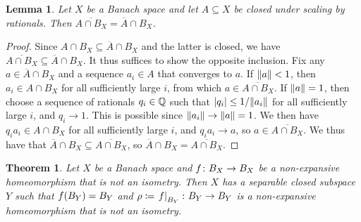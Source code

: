 \documentclass{amsart}
\newtheorem{theorem}{Theorem}[section]
\newtheorem{lemma}{Lemma}[section]
\theoremstyle{definition}
\newcommand{\clo}[1]{\overline{#1}}
\begin{document}
\begin{lemma}
    \label{rat-scaling}
    Let $X$ be a Banach space and let $A \subseteq X$ be closed under scaling by rationals. Then $\clo{A \cap B_X} = \clo{A} \cap B_X$.
\end{lemma}

\begin{proof}
Since $A \cap B_X \subseteq \clo{A} \cap B_X$ and the latter is closed, we
have $\clo{A \cap B_X} \subseteq \clo{A} \cap B_X$. It thus suffices to show
the opposite inclusion. Fix any $a \in \clo{A} \cap B_X$ and a sequence $a_i
\in A$ that converges to $a$. If $\norm{a} < 1$, then $a_i \in A \cap B_X$ for
all sufficiently large $i$, from which $a \in \clo{A \cap B_X}$. If $\norm{a} =
1$, then choose a sequence of rationals $q_i \in \mathbb{Q}$ such that $\abs{q_i} \leq 1/
\norm{a_i}$ for all sufficiently large $i$, and $q_i \to 1$. This is possible
since $\norm{a_i} \to \norm{a} = 1$. We then have $q_i a_i \in A \cap B_X$ for all
sufficiently large $i$, and $q_i a_i \to a$, so $a \in \clo{A \cap B_X}$. We thus
have that $\clo{A} \cap B_X \subseteq \clo{A \cap B_X}$, so $\clo{A} \cap B_X =
\clo{A \cap B_X}$.
\end{proof}

\newcommand\restr[2]{\ensuremath{\left.#1\right|_{#2}}}

\begin{theorem}
    Let $X$ be a Banach space and $f \colon  B_X \to B_X$ be a non-expansive homeomorphism that is not an isometry. Then $X$ has a separable closed subspace $Y$ such that $f(B_Y) = B_Y$ and $\rho \coloneqq \restr{\lip}{B_Y}  \colon  B_Y \to B_Y$ is a non-expansive homeomorphism that is not an isometry.
\end{theorem}
\end{document}
